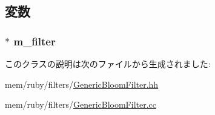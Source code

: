 \subsection{変数}
\hypertarget{classGenericBloomFilter_a782a41d6e6400f2a9b744e79f4a84550}{
\subsubsection[{m\_\-filter}]{$\ast$ {\bf m\_\-filter}}}
\label{classGenericBloomFilter_a782a41d6e6400f2a9b744e79f4a84550}


このクラスの説明は次のファイルから生成されました:\begin{DoxyCompactItemize}
\item 
mem/ruby/filters/\hyperlink{GenericBloomFilter_8hh}{GenericBloomFilter.hh}\item 
mem/ruby/filters/\hyperlink{GenericBloomFilter_8cc}{GenericBloomFilter.cc}\end{DoxyCompactItemize}

